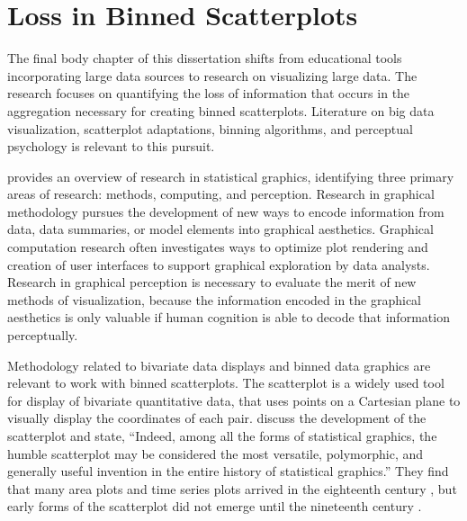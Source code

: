 \documentclass[11pt]{isuthesis}
\begin{document}
\section{Loss in Binned Scatterplots}

The final body chapter of this dissertation shifts from educational tools incorporating large data sources to research on visualizing large data. The research focuses on quantifying the loss of information that occurs in the aggregation necessary for creating binned scatterplots. Literature on big data visualization, scatterplot adaptations, binning algorithms, and perceptual psychology is relevant to this pursuit. 

\citet{Cleveland1987} provides an overview of research in statistical graphics, identifying three primary areas of research: methods, computing, and perception. Research in graphical methodology pursues the development of new ways to encode information from data, data summaries, or model elements into graphical aesthetics. Graphical computation research often investigates ways to optimize plot rendering and creation of user interfaces to support graphical exploration by data analysts. Research in graphical perception is necessary to evaluate the merit of new methods of visualization, because the information encoded in the graphical aesthetics is only valuable if human cognition is able to decode that information perceptually. 

Methodology related to bivariate data displays and binned data graphics are relevant to work with binned scatterplots. The scatterplot is a widely used tool for display of bivariate quantitative data, that uses points on a Cartesian plane to visually display the coordinates of each pair. \citet{friendly2005early} discuss the development of the scatterplot and state, ``Indeed, among all the forms of statistical graphics, the humble scatterplot may be considered the most versatile, polymorphic, and generally useful invention in the entire history of statistical graphics.'' They find that many area plots and time series plots arrived in the eighteenth century \citep{playfair}, but early forms of the scatterplot did not emerge until the nineteenth century \citep{Herschel1833}. 
\end{document}
